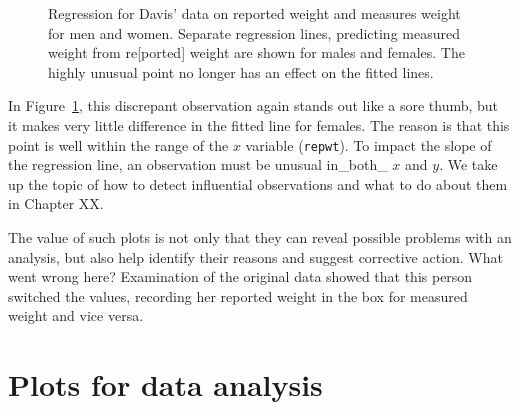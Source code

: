 \documentclass[
  letterpaper,
  10pt,
  krantz2]{krantz}
\begin{document}
\begin{figure}[H]


\caption{\label{fig-ch02-davis-reg2}Regression for Davis' data on
reported weight and measures weight for men and women. Separate
regression lines, predicting measured weight from re{[}ported{]} weight
are shown for males and females. The highly unusual point no longer has
an effect on the fitted lines.}

\end{figure}%

In Figure~\ref{fig-ch02-davis-reg2}, this discrepant observation again
stands out like a sore thumb, but it makes very little difference in the
fitted line for females. The reason is that this point is well within
the range of the \(x\) variable (\texttt{repwt}). To impact the slope of
the regression line, an observation must be unusual in\_both\_ \(x\) and
\(y\). We take up the topic of how to detect influential observations
and what to do about them in Chapter XX.

The value of such plots is not only that they can reveal possible
problems with an analysis, but also help identify their reasons and
suggest corrective action. What went wrong here? Examination of the
original data showed that this person switched the values, recording her
reported weight in the box for measured weight and vice versa.

\section{Plots for data analysis}\label{plots-for-data-analysis}
\end{document}
